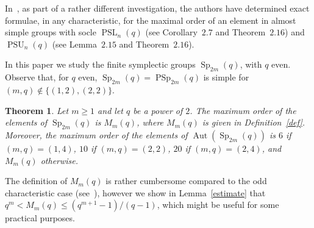 \documentclass{amsart}
\newtheorem{theorem}{Theorem}[section]
\begin{document}
In~\cite{DGPS}, as part of a rather different investigation, the authors have determined exact formulae, in any characteristic, for the maximal order of an element in almost simple groups with socle ${\mathop{\textrm{PSL}}}_n(q)$ (see Corollary~$2.7$ and Theorem~$2.16$) and ${\mathop{\textrm{PSU}}}_n(q)$ (see Lemma~$2.15$ and Theorem~$2.16$). 

In this paper we study the finite symplectic groups ${\mathop{\mathrm{Sp}}}_{2m}(q)$, with $q$ even. Observe that, for $q$ even, ${\mathop{\mathrm{Sp}}}_{2m}(q)={\mathop{\mathrm{PSp}}}_{2m}(q)$ is simple for $(m,q)\notin\{ (1,2),(2,2)\}$.

\begin{theorem}\label{thrm}
Let $m\geq 1$ and let $q$ be a power of $2$. The maximum order of the  elements of ${\mathop{\mathrm{Sp}}}_{2m}(q)$ is $M_m(q)$, where $M_m(q)$ is given in Definition~\ref{def}. Moreover, the maximum order of the elements of ${\mathop{\mathrm{Aut}}}({\mathop{\mathrm{Sp}}}_{2m}(q))$ is $6$ if $(m,q)=(1,4)$, $10$ if $(m,q)=(2,2)$, $20$ if $(m,q)=(2,4)$, and $M_m(q)$ otherwise.
\end{theorem}

The definition of $M_m(q)$ is rather cumbersome compared to the odd characteristic case (see~\cite[Table~A.3]{KS}), however we show in Lemma~\ref{estimate} that $q^m<M_m(q)\leq (q^{m+1}-1)/(q-1)$, which might be useful for some  practical purposes.
\end{document}
